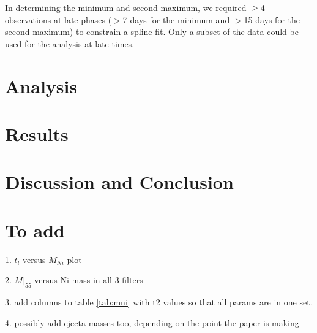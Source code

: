 \documentclass{aa}
\begin{document}
In determining the  
minimum and second maximum, we required $\geq$4
observations at late phases ($>$7 days for the minimum and $>$15 days
for the second maximum) to constrain a spline fit. Only a subset
of the data could be used for the analysis at late times.
\fi
\section{Analysis}
\label{sec-ana}


\section{Results}
\label{sec-res}


\section{Discussion and Conclusion}
\label{sec-dnc}

\section{To add}
1. $t_l$ versus $M_{Ni}$ plot


2. $M|_{55}$ versus Ni mass in all 3 filters


3. add columns to table \ref{tab:mni} with t2 values so that all params are in one set.



4. possibly add ejecta masses too, depending on the point the paper is making

\end{document}
